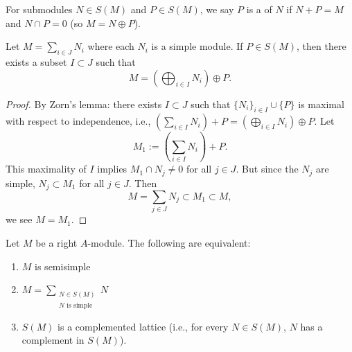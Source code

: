 
\lecture{}

\begin{definition}
For submodules $N\in S(M)$ and $P\in S(M)$, we say $P$ is a
 of $N$ if $N+P=M$ and $N\cap P=0$ (so $M=N\oplus P$).
\end{definition}

\begin{lemma}\label{lemma:2.14}
Let $M=\sum_{i\in J}N_{i}$ where each $N_{i}$ is a simple module. If
$P\in S(M)$, then there exists a subset $I\subset J$ such that
\begin{equation}
M=\left(\bigoplus_{i\in I}N_{i}\right)\oplus P.
\end{equation}
\end{lemma}

\begin{proof}
By Zorn's lemma: there exists $I\subset J$ such that $\{N_{i}\}_{i\in I}\cup\{P\}$
is maximal with respect to independence, i.e., $(\sum_{i\in I}N_{i})+P=(\bigoplus_{i\in I}N_{i})\oplus P$.
Let
\begin{equation}
M_{1}:=\left(\sum_{i\in I}N_{i}\right)+P.
\end{equation}
This maximality of $I$ implies $M_{1}\cap N_{j}\neq0$ for all $j\in J$.
But since the $N_{j}$ are simple, $N_{j}\subset M_{1}$ for all $j\in J$.
Then
\begin{equation}
M=\sum_{j\in J}N_{j}\subset M_{1}\subset M, 
\end{equation}
we see $M=M_{1}$.
\end{proof}

\begin{proposition}\label{prop:2.15}
Let $M$ be a right $A$-module. The following are equivalent:
\begin{enumerate}
\item $M$ is semisimple
\item $\displaystyle M=\sum_{\substack{N\in S(M)\\ N\text{ is simple}}}N$
\item $S(M)$ is a complemented lattice (i.e., for every $N\in S(M)$,
  $N$ has a complement in $S(M)$).
\end{enumerate}
\end{proposition}

